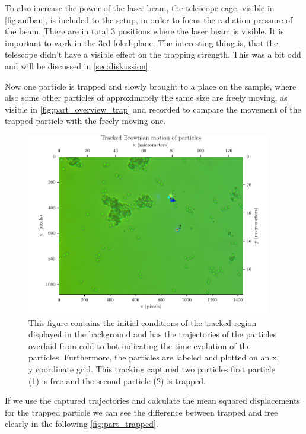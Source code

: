 \documentclass[12pt,english]{scrartcl}
\begin{document}
To also increase the power of the laser beam, the telescope cage, visible in
\autoref{fig:aufbau}, is included to the setup, in order to focus the radiation
pressure of the beam. There are in total 3 positions where the laser beam is
visible. It is important to work in the 3rd fokal plane. The interesting thing
is, that the telescope didn't have a visible effect on the trapping strength.
This was a bit odd and will be discussed in \autoref{sec:diskussion}.

Now one particle is trapped and slowly brought to a place on the sample, where
also some other particles of approximately the same size are freely moving, as
visible in \autoref{fig:part_overview_trap} and recorded to compare the
movement of the trapped particle with the freely moving one.

\begin{figure}[H]
	\centering
	\includegraphics[width=0.95\textwidth]{figures/III_tracked.pdf}
	\caption[Capture of trapped particle]{This figure contains the initial conditions of the
		tracked region displayed in the background and has the trajectories of the
		particles overlaid from cold to hot indicating the time evolution of the
		particles. Furthermore, the particles are labeled and plotted on an x, y
		coordinate grid. This tracking captured two particles first particle (1) is
		free and the second particle (2) is trapped.
	}\label{fig:part_overview_trap}
\end{figure}

If we use the captured trajectories and calculate the mean squared
displacements for the trapped particle we can see the difference between
trapped and free clearly in the following \autoref{fig:part_trapped}.
\end{document}
